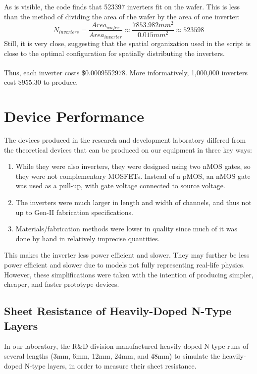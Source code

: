 \documentclass[12pt]{article}
\begin{document}
\\
\\As is visible, the code finds that 523397 inverters fit on the wafer. This is less than the method of dividing the area of the wafer by the area of one inverter:
\[ N_{inverters} = \frac{Area_{wafer}}{Area_{inverter}} \approx \frac{7853.982mm^2}{0.015mm^2} \approx 523598 \]
Still, it is very close, suggesting that the spatial organization used in the script is close to the optimal configuration for spatially distributing the inverters.
\\
\\Thus, each inverter costs \$0.0009552978. More informatively, 1,000,000 inverters cost \$955.30 to produce.

\pagebreak

\section{Device Performance}
The devices produced in the research and development laboratory differed from the theoretical devices that can be produced on our equipment in three key ways:
\begin{enumerate}
    \item While they were also inverters, they were designed using two nMOS gates, so they were not complementary MOSFETs. Instead of a pMOS, an nMOS gate was used as a pull-up, with gate voltage connected to source voltage.
    \item The inverters were much larger in length and width of channels, and thus not up to Gen-II fabrication specifications.
    \item Materials/fabrication methods were lower in quality since much of it was done by hand in relatively imprecise quantities.
\end{enumerate}
This makes the inverter less power efficient and slower. They may further be less power efficient and slower due to models not fully representing real-life physics. However, these simplifications were taken with the intention of producing simpler, cheaper, and faster prototype devices.

\subsection{Sheet Resistance of Heavily-Doped N-Type Layers}
In our laboratory, the R\&D division manufactured heavily-doped N-type runs of several lengths (3mm, 6mm, 12mm, 24mm, and 48mm) to simulate the heavily-doped N-type layers, in order to measure their sheet resistance. 
\end{document}
